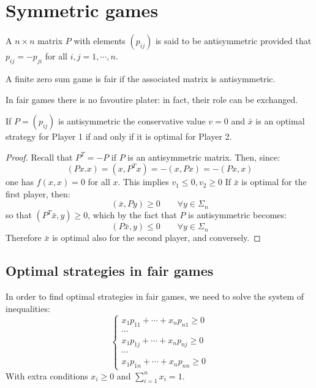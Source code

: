 \section{Symmetric games}

\begin{definition}
    A $n \times n$ matrix $P$ with elements $(p_{ij})$ is said to be antisymmetric provided that $p_{ij}=-p_{ji}$ for all $i,j=1,\cdots,n$. 
\end{definition}
\begin{definition}
    A finite zero sum game is fair if the associated matrix is antisymmetric.
\end{definition}
In fair games there is no favoutire plater: in fact, their role can be exchanged. 
\begin{proposition}
    If $P=(p_{ij})$ is antisymmetric the conservative value $v=0$ and $\bar{x}$ is an optimal strategy for Player 1 if and only if it is optimal for Player 2.
\end{proposition}
\begin{proof}
    Recall that $P^T=-P$ if $P$ is an antisymmetric matrix. 
    Then, since: 
    \[(Px.x)=(x,P^Tx)=-(x,Px)=-(Px,x)\]
    one has $f(x,x)=0$ for all $x$. 
    This implies $v_1\leq 0,v_2\geq 0$
    If $\bar{x}$ is optimal for the first player, then: 
    \[(\bar{x},Py)\geq 0 \qquad \forall y \in \Sigma_n\]
    so that $(P^T\bar{x},y)\geq 0$, which by the fact that $P$ is antisymmetric becomes: 
    \[(P\bar{x},y)\leq 0 \qquad \forall y \in \Sigma_n\]
    Therefore $\bar{x}$ is optimal also for the second player, and conversely.
\end{proof}

\subsection{Optimal strategies in fair games}
In order to find optimal strategies in fair games, we need to solve the system of inequalities: 
\[\begin{cases}
    x_1p_{11}+\cdots+x_np_{n1}\geq 0 \\
    \cdots \\
    x_1p_{1j}+\cdots+x_np_{nj}\geq 0 \\
    \cdots \\
    x_1p_{1n}+\cdots+x_np_{nn}\geq 0
\end{cases}\]
With extra conditions $x_i\geq 0$ and $\sum_{i=1}^nx_i=1$. 




